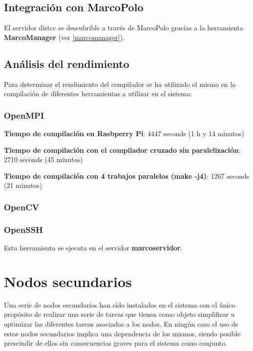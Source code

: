 \subsection{Integración con MarcoPolo}

El servidor distcc es descubrible a través de MarcoPolo gracias a la herramienta \textbf{MarcoManager} (ver \ref{marcomanager}).

\subsection{Análisis del rendimiento}

Para determinar el rendimiento del compilador se ha utilizado el mismo en la compilación de diferentes herramientas a utilizar en el sistema:

\subsubsection{OpenMPI}

\textbf{Tiempo de compilación en Rasbperry Pi}: 4447 seconds (1 h y 14 minutos)

\textbf{Tiempo de compilación con el compilador cruzado sin paralelización}: 2710 seconds (45 minutos)

\textbf{Tiempo de compilación con 4 trabajos paralelos (make -j4)}: 1267 seconds (21 minutos)

\subsubsection{OpenCV}

\subsubsection{OpenSSH}

Esta herramienta se ejecuta en el servidor \textbf{marcoservidor}.

\section{Nodos secundarios}

Una serie de nodos secundarios han sido instalados en el sistema con el único propósito de realizar una serie de tareas que tienen como objeto simplificar u optimizar las diferentes tareas asociadas a los nodos. En ningún caso el uso de estos nodos secundarios implica una dependencia de los mismos, siendo posible prescindir de ellos sin consecuencias graves para el sistema como conjunto.

